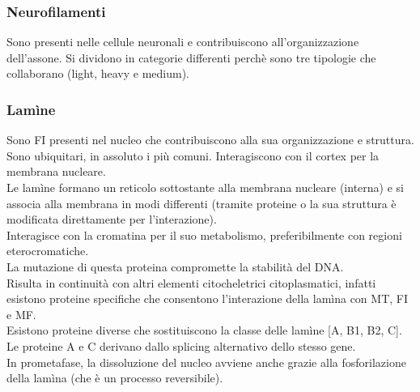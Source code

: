         \subsubsection{Neurofilamenti}
            Sono presenti nelle cellule neuronali e contribuiscono all'organizzazione dell'assone. Si dividono in categorie differenti perchè sono tre tipologie che collaborano (light, heavy e medium).
        \subsubsection{Lamìne}
            Sono FI presenti nel nucleo che contribuiscono alla sua organizzazione e struttura.
            Sono ubiquitari, in assoluto i più comuni. Interagiscono con il cortex per la membrana nucleare. \\
            Le lamìne formano un reticolo sottostante alla membrana nucleare (interna) e si associa alla membrana in modi differenti (tramite proteine o la sua struttura è modificata direttamente per l'interazione). \\
            Interagisce con la cromatina per il suo metabolismo, preferibilmente con regioni eterocromatiche.\\
            La mutazione di questa proteina compromette la stabilità del DNA.\\
            Risulta in continuità con altri elementi citocheletrici citoplasmatici, infatti esistono proteine specifiche che consentono l'interazione della lamìna con MT, FI e MF.\\
            Esistono proteine diverse che sostituiscono la classe delle lamìne [A, B1, B2, C]. Le proteine A e C derivano dallo splicing alternativo dello stesso gene.\\
            In prometafase, la dissoluzione del nucleo avviene anche grazie alla fosforilazione della lamìna (che è un processo reversibile).


